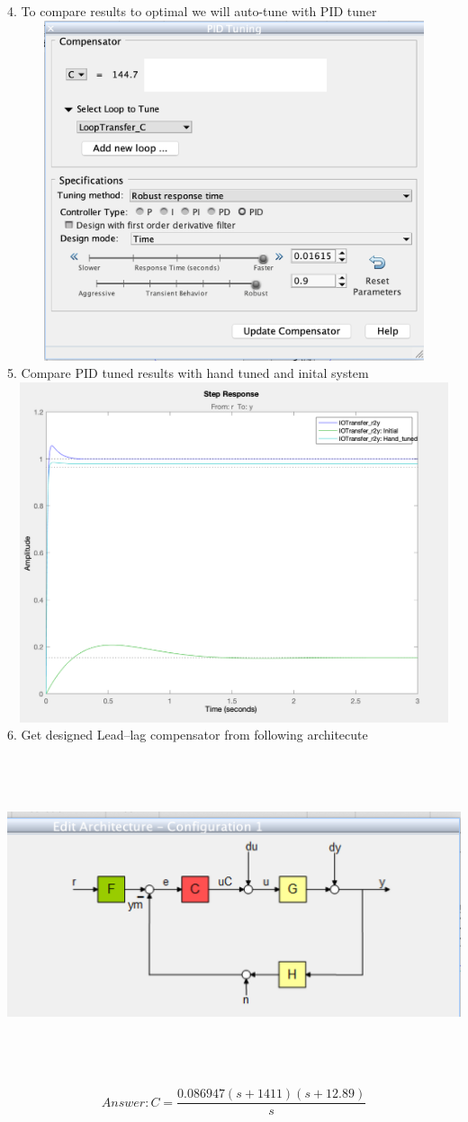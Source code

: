 \documentclass[a4paper,11pt]{article}
\theoremstyle{mytheor}
\begin{document}
$$$$
4. To compare results to optimal we will auto-tune with PID tuner
$$$$
\includegraphics[width=15.5cm, height=10cm]{PID_tuned.png}
$$$$
5. Compare PID tuned results with hand tuned and inital system
$$$$
\includegraphics[width=15.5cm, height=10cm]{final_results.png}
$$$$
6. Get designed Lead–lag compensator from following architecute
$$$$
\includegraphics[width=15.5cm, height=10cm]{lag_architecture.png}
$$Answer:C = \frac{0.086947(s+1411)(s+12.89)}{s}$$
\end{document}
